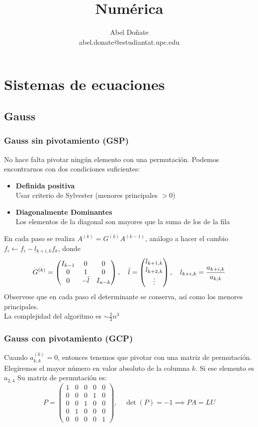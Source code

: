 \documentclass[leqno]{article}
\title{Numérica}
\author{Abel Doñate \\ abel.donate@estudiantat.upc.edu}
\date{}
\begin{document}
\maketitle
\tableofcontents
\newpage

\section{Sistemas de ecuaciones}
\subsection{Gauss}
\subsubsection{Gauss sin pivotamiento (GSP)}
No hace falta pivotar ningún elemento con una permutación.
Podemos encontrarnos con dos condiciones suficientes:
\begin{itemize}
    \item \textbf{Definida positiva} \\ Usar criterio de Sylvester (menores principales $>0$)
    \item \textbf{Diagonalmente Dominantes} \\ Los elementos de la diagonal son mayores que la suma de los de la fila
\end{itemize}
En cada paso se realiza $A^{(k)} = G^{(k)}A^{(k-1)}$, análogo a hacer el cambio $f_i \leftarrow f_i-l_{k+i,k}f_k$, donde
\[G^{(k)} =  
\begin{pmatrix}
    \textbf{$I_{k-1}$} & 0 & 0 \\
    0 & 1 & 0 \\
    0 & -\Bar{l} & \textbf{$I_{n-k}$}
\end{pmatrix}, \hspace{1em} 
\Bar{l} =\begin{pmatrix}
    l_{k+1,k} \\
    l_{k+2,k}\\
    \vdots
\end{pmatrix}, \hspace{1em} l_{k+i,k} = \frac{a_{k+i, k}}{a_{k,k}} \]
Observese que en cada paso el determinante se conserva, así como los menores principales. \\
La complejidad del algoritmo es $\sim \frac{2}{3}n^3$

\subsubsection{Gauss con pivotamiento (GCP)}
Cuando $a^{(k)}_{k,k} = 0$, entonces tenemos que pivotar con una matriz de permutación. Elegiremos el mayor número en valor absoluto de la columna $k$. Si ese elemento es $a_{2,4}$ Su matriz de permutación es:
\[P = 
\begin{pmatrix}1&0&0&0&0\\0&0&0&1&0\\0&0&1&0&0\\0&1&0&0&0\\0&0&0&0&1\end{pmatrix}, \hspace{1em} \det(P)=-1 \implies PA=LU\]
\end{document}

